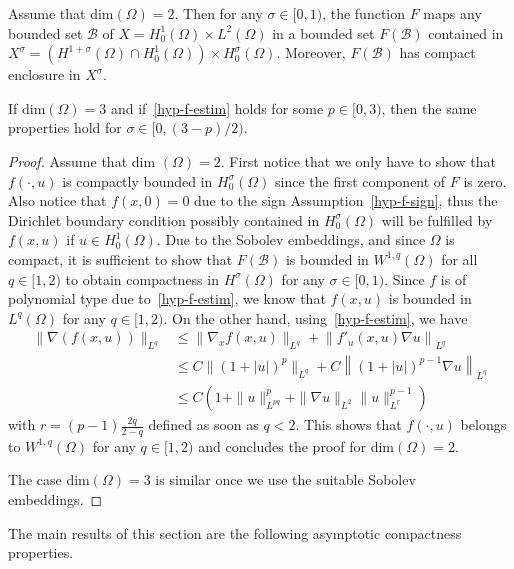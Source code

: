 \documentclass[AHL,Unicode,longabstracts]{cedram}
\newcommand{\Bc}{\mathcal{B}}
\newcommand{\grad}{\nabla}
\begin{document}
\begin{prop}\label{prop-compact-F}
Assume that dim$(\Omega)=2$. Then for any $\sigma\in [0,1)$, the function $F$ maps any bounded set $\Bc$ of $X=H^1_0(\Omega)\times L^2(\Omega)$ in a bounded set $F(\Bc)$ contained in $X^\sigma= (H^{1+\sigma}(\Omega)\cap H^1_0(\Omega))\times H^\sigma_0(\Omega)$. Moreover, $F(\Bc)$ has compact enclosure in $X^\sigma$.

If dim$(\Omega)=3$ and if~\eqref{hyp-f-estim} holds for some $p\in [0,3)$, then the same properties hold for $\sigma\in [0,(3-p)/2)$.
\end{prop}
\begin{proof}
Assume that dim $(\Omega)=2$. First notice that we only have to show that $f(\cdot,u)$ is compactly bounded in $H^\sigma_0(\Omega)$ since the first component of $F$ is zero. Also notice that $f(x,0)=0$ due to the sign Assumption~\eqref{hyp-f-sign}, thus the Dirichlet boundary condition possibly contained in $H^\sigma_0(\Omega)$ will be fulfilled by $f(x,u)$ if $u\in H^1_0(\Omega)$. Due to the Sobolev embeddings, and since $\Omega$ is compact, it is sufficient to show that $F(\Bc)$ is bounded in $W^{1,q}(\Omega)$ for all $q\in [1,2)$ to obtain compactness in $H^\sigma(\Omega)$ for any $\sigma\in [0,1)$. Since $f$ is of polynomial type due to~\eqref{hyp-f-estim}, we know that $f(x,u)$ is bounded in $L^q(\Omega)$ for any $q\in [1,2)$. On the other hand, using~\eqref{hyp-f-estim}, we have
\begin{align*}
\|\grad(f(x,u))\|_{L^q} & \leq \|\grad_xf(x,u)\|_{L^q} + \left\|f'_u(x,u)\grad u\right\|_{L^q}\\
& \leq C \|(1+|u|)^p \|_{L^q} + C \left\|(1+|u|)^{p-1} \grad u\right\|_{L^q}\\
& \leq C\left(1+\|u\|_{L^{pq}}^p + \|\grad u\|_{L^2} \|u\|^{p-1}_{L^r}\right)
\end{align*}
with $r=(p-1)\frac {2q}{2-q}$ defined as soon as $q<2$. This shows that $f(\cdot,u)$ belongs to $W^{1,q}(\Omega)$ for any $q\in [1,2)$ and concludes the proof for dim$(\Omega)=2$.

The case dim$(\Omega)=3$ is similar once we use the suitable Sobolev embeddings.
\end{proof}


The main results of this section are the following asymptotic compactness properties.
\end{document}
